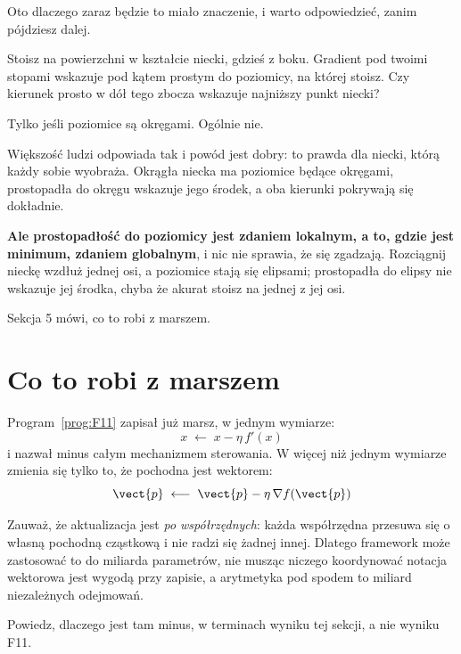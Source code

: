 \begin{fr}
Oto dlaczego zaraz będzie to miało znaczenie, i warto odpowiedzieć, zanim
pójdziesz dalej.

Stoisz na powierzchni w kształcie niecki, gdzieś z boku. Gradient pod twoimi
stopami wskazuje pod kątem prostym do poziomicy, na której stoisz. Czy
kierunek prosto w dół tego zbocza wskazuje najniższy punkt niecki?
\dotline
\nextframe
\end{fr}

\begin{fr}
\begin{ansblock}
Tylko jeśli poziomice są okręgami. Ogólnie nie.
\end{ansblock}

Większość ludzi odpowiada tak i powód jest dobry: to prawda dla niecki, którą
każdy sobie wyobraża. Okrągła niecka ma poziomice będące okręgami, prostopadła
do okręgu wskazuje jego środek, a oba kierunki pokrywają się dokładnie.

\textbf{Ale prostopadłość do poziomicy jest zdaniem lokalnym, a to, gdzie jest
minimum, zdaniem globalnym}, i nic nie sprawia, że się zgadzają. Rozciągnij
nieckę wzdłuż jednej osi, a poziomice stają się elipsami; prostopadła do
elipsy nie wskazuje jej środka, chyba że akurat stoisz na jednej z jej osi.

Sekcja 5 mówi, co to robi z marszem.

\end{fr}

\section{Co to robi z marszem}
\label{sec:P15-zigzag}

\begin{fr}
Program~\ref{prog:F11} zapisał już marsz, w jednym wymiarze:
\[ x \;\longleftarrow\; x - \eta\, f'(x) \]
i nazwał minus całym mechanizmem sterowania. W więcej niż jednym wymiarze
zmienia się tylko to, że pochodna jest wektorem:
\[ \vect{p} \;\longleftarrow\; \vect{p} - \eta\, \nabla f(\vect{p}) \]

Zauważ, że aktualizacja jest \emph{po współrzędnych}: każda współrzędna
przesuwa się o własną pochodną cząstkową i nie radzi się żadnej innej.
Dlatego framework może zastosować to do miliarda parametrów, nie musząc niczego
koordynować \dash{} notacja wektorowa jest wygodą przy zapisie, a arytmetyka
pod spodem to miliard niezależnych odejmowań.

Powiedz, dlaczego jest tam minus, w terminach wyniku tej sekcji, a nie wyniku
F11.
\dotline
\nextframe
\end{fr}

